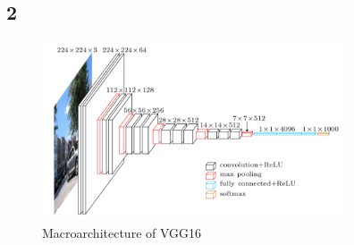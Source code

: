\newpage

\subsection*{2}

\begin{figure}[h]
	\centering
	\includegraphics[height=200px]{gfx/vgg16.png}
	\caption{Macroarchitecture of VGG16\\
		\cite{VGG16}}
	\label{fig:VGG16}
\end{figure}
